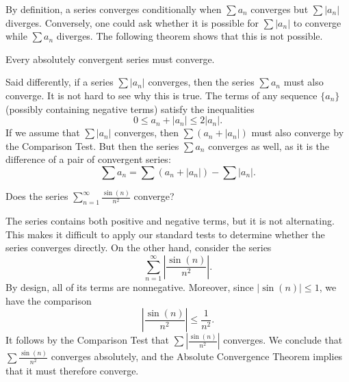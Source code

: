 \documentclass{ximera}
\begin{document}
By definition, a series converges conditionally when $\sum a_n$ converges but $\sum |a_n|$ diverges. Conversely, one could ask whether it is possible for $\sum |a_n|$ to converge while $\sum a_n$ diverges. The following theorem shows that this is not possible.

\begin{theorem}
Every absolutely convergent series must converge.
\end{theorem}

Said differently, if a series $\sum |a_n|$ converges, then the series $\sum a_n$ must also converge. It is not hard to see why this is true. The terms of any sequence $\{a_n\}$ (possibly containing negative terms) satisfy the inequalities
$$
0 \leq a_n + |a_n| \leq 2|a_n|.
$$
If we assume that $\sum |a_n|$ converges, then $\sum (a_n + |a_n|)$ must also converge by the Comparison Test. But then the series $\sum a_n$ converges as well, as it is the difference of a pair of convergent series:
$$
\sum a_n = \sum (a_n + |a_n|) - \sum |a_n|.
$$

\begin{example}
Does the series $\sum_{n=1}^\infty \frac{\sin(n)}{n^2}$ converge?

The series contains both positive and negative terms, but it is not alternating. This makes it difficult to apply our standard tests to determine whether the series converges directly. On the other hand, consider the series 
$$
\sum_{n=1}^\infty  \left|\frac{\sin(n)}{n^2}\right|.
$$
By design, all of its terms are nonnegative. Moreover, since $|\sin(n)| \leq 1$, we have the comparison
$$
\left|\frac{\sin(n)}{n^2} \right| \leq \frac{1}{n^2}.
$$
It follows by the Comparison Test that $\sum \left|\frac{\sin (n)}{n^2}\right|$ converges. We conclude that $\sum \frac{\sin(n)}{n^2}$ converges absolutely, and the Absolute Convergence Theorem implies that it must therefore converge.
\end{example}
\end{document}
